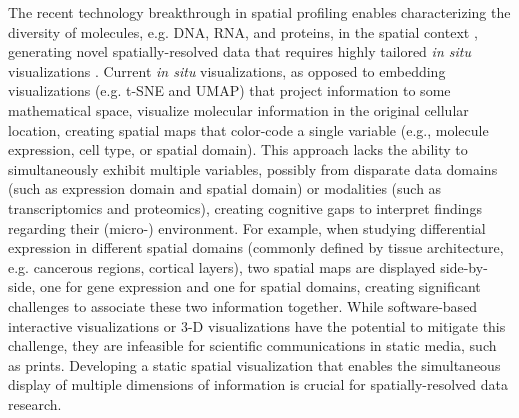 \documentclass[11pt]{article}
\begin{document}
The recent technology breakthrough in spatial profiling enables characterizing the diversity of molecules, e.g. DNA, RNA, and proteins, in the spatial context \cite{moffitt_2022}, generating novel spatially-resolved data that requires highly tailored \textit{in situ} visualizations \cite{dries_2021, Lewis_2021, odonoghue_2021}. Current \textit{in situ} visualizations, as opposed to embedding visualizations (e.g. t-SNE and UMAP) that project information to some mathematical space, visualize molecular information in the original cellular location, creating spatial maps that color-code a single variable (e.g., molecule expression, cell type, or spatial domain). This approach lacks the ability to simultaneously exhibit multiple variables, possibly from disparate data domains (such as expression domain and spatial domain) or modalities (such as transcriptomics and proteomics), creating cognitive gaps to interpret findings regarding their (micro-) environment. For example, when studying differential expression in different spatial domains (commonly defined by tissue architecture, e.g. cancerous regions, cortical layers), two spatial maps are displayed side-by-side, one for gene expression and one for spatial domains, creating significant challenges to associate these two information together. While software-based interactive visualizations or 3-D visualizations have the potential to mitigate this challenge, they are infeasible for scientific communications in static media, such as prints. Developing a static spatial visualization that enables the simultaneous display of multiple dimensions of information is crucial for spatially-resolved data research.

\end{document}

